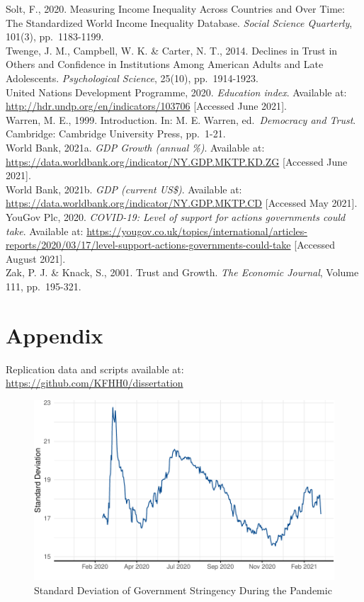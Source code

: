 \documentclass[
  12pt,
]{article}
\begin{document}
Solt, F., 2020. Measuring Income Inequality Across Countries and Over Time: The Standardized World Income Inequality Database. \emph{Social Science Quarterly}, 101(3), pp.~1183-1199.\\
Twenge, J. M., Campbell, W. K. \& Carter, N. T., 2014. Declines in Trust in Others and Confidence in Institutions Among American Adults and Late Adolescents. \emph{Psychological Science}, 25(10), pp.~1914-1923.\\
United Nations Development Programme, 2020. \emph{Education index}. Available at: \url{http://hdr.undp.org/en/indicators/103706} {[}Accessed June 2021{]}.\\
Warren, M. E., 1999. Introduction. In: M. E. Warren, ed.~\emph{Democracy and Trust}. Cambridge: Cambridge University Press, pp.~1-21.\\
World Bank, 2021a. \emph{GDP Growth (annual \%)}. Available at: \url{https://data.worldbank.org/indicator/NY.GDP.MKTP.KD.ZG} {[}Accessed June 2021{]}.\\
World Bank, 2021b. \emph{GDP (current US\$)}. Available at: \url{https://data.worldbank.org/indicator/NY.GDP.MKTP.CD} {[}Accessed May 2021{]}.\\
YouGov Plc, 2020. \emph{COVID-19: Level of support for actions governments could take}. Available at: \url{https://yougov.co.uk/topics/international/articles-reports/2020/03/17/level-support-actions-governments-could-take} {[}Accessed August 2021{]}.\\
Zak, P. J. \& Knack, S., 2001. Trust and Growth. \emph{The Economic Journal}, Volume 111, pp.~195-321.\\

\newpage

\hypertarget{appendix}{%
\section*{Appendix}\label{appendix}}

\setcounter{table}{0}  \renewcommand{\thetable}{A\arabic{table}} \setcounter{figure}{0} \renewcommand{\thefigure}{A\arabic{figure}}

Replication data and scripts available at: \url{https://github.com/KFHH0/dissertation}

\begin{figure}
\includegraphics[width=0.8\linewidth]{write_up_test_files/figure-latex/stringency-sd-1} \caption{Standard Deviation of Government Stringency During the Pandemic}\label{fig:stringency-sd}
\end{figure}
\end{document}

